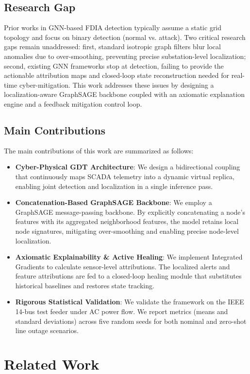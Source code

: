 \documentclass[conference]{IEEEtran}
\begin{document}
\subsection{Research Gap}
Prior works in GNN-based FDIA detection typically assume a static grid topology and focus on binary detection (normal vs. attack). Two critical research gaps remain unaddressed: first, standard isotropic graph filters blur local anomalies due to over-smoothing, preventing precise substation-level localization; second, existing GNN frameworks stop at detection, failing to provide the actionable attribution maps and closed-loop state reconstruction needed for real-time cyber-mitigation. This work addresses these issues by designing a localization-aware GraphSAGE backbone coupled with an axiomatic explanation engine and a feedback mitigation control loop.

\subsection{Main Contributions}
The main contributions of this work are summarized as follows:
\begin{itemize}
    \item \textbf{Cyber-Physical GDT Architecture}: We design a bidirectional coupling that continuously maps SCADA telemetry into a dynamic virtual replica, enabling joint detection and localization in a single inference pass.
    \item \textbf{Concatenation-Based GraphSAGE Backbone}: We employ a GraphSAGE message-passing backbone. By explicitly concatenating a node's features with its aggregated neighborhood features, the model retains local node signatures, mitigating over-smoothing and enabling precise node-level localization.
    \item \textbf{Axiomatic Explainability & Active Healing}: We implement Integrated Gradients to calculate sensor-level attributions. The localized alerts and feature attributions are fed to a closed-loop healing module that substitutes historical baselines and restores state tracking.
    \item \textbf{Rigorous Statistical Validation}: We validate the framework on the IEEE 14-bus test feeder under AC power flow. We report metrics (means and standard deviations) across five random seeds for both nominal and zero-shot line outage scenarios.
\end{itemize}

\section{Related Work}
\end{document}
